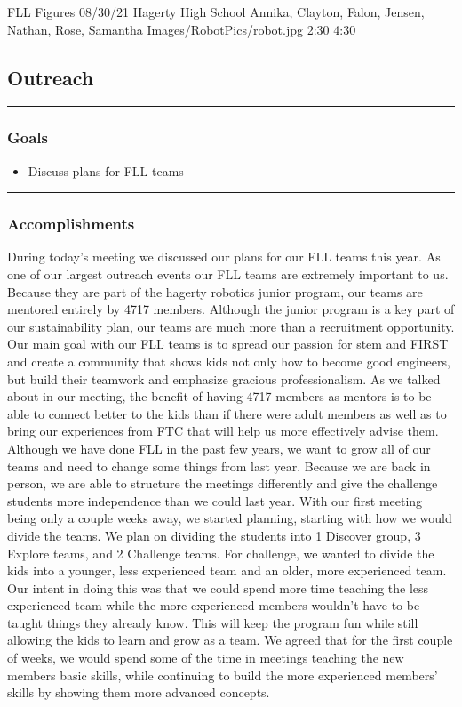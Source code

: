 \insertmeeting 
	{FLL Figures} 
	{08/30/21}
	{Hagerty High School}
	{Annika, Clayton, Falon, Jensen, Nathan, Rose, Samantha}
	{Images/RobotPics/robot.jpg}
	{2:30}
  	{4:30}
	
\subsection*{Outreach}
\noindent\hfil\rule{\textwidth}{.4pt}\hfil
\subsubsection*{Goals}
\begin{itemize}
    \item Discuss plans for FLL teams
\end{itemize} 

\noindent\hfil\rule{\textwidth}{.4pt}\hfil

\subsubsection*{Accomplishments}
During today’s meeting we discussed our plans for our FLL teams this year. As one of our largest outreach events our FLL teams are extremely important to us. Because they are part of the hagerty robotics junior program, our teams are mentored entirely by 4717 members. Although the junior program is a key part of our sustainability plan, our teams are much more than a recruitment opportunity. Our main goal with our FLL teams is to spread our passion for stem and FIRST and create a community that shows kids not only how to become good engineers, but build their teamwork and emphasize gracious professionalism. As we talked about in our meeting, the benefit of having 4717 members as mentors is to be able to connect better to the kids than if there were adult members as well as to bring our experiences from FTC that will help us more effectively advise them.
Although we have done FLL in the past few years, we want to grow all of our teams and need to change some things from last year. Because we are back in person, we are able to structure the meetings differently and give the challenge students more independence than we could last year. With our first meeting being only a couple weeks away, we started planning, starting with how we would divide the teams. We plan on dividing the students into 1 Discover group, 3 Explore teams, and 2 Challenge teams. For challenge, we wanted to divide the kids into a younger, less experienced team and an older, more experienced team. Our intent in doing this was that we could spend more time teaching the less experienced team while the more experienced members wouldn't have to be taught things they already know. This will keep the program fun while still allowing the kids to learn and grow as a team. We agreed that for the first couple of weeks, we would spend some of the time in meetings teaching the new members basic skills, while continuing to build the more experienced members’ skills by showing them more advanced concepts.
